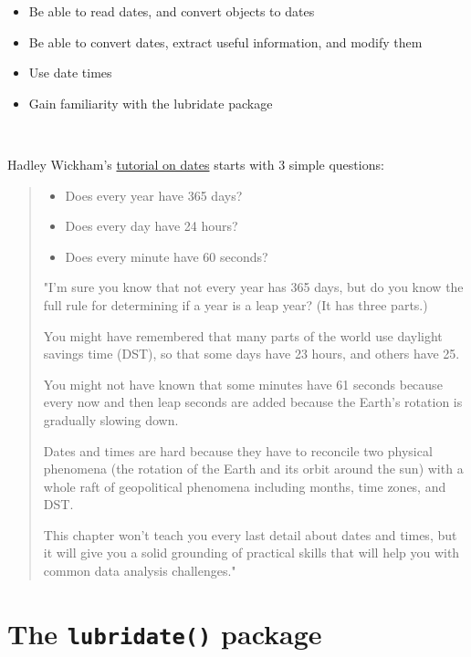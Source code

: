 \documentclass[]{book}
\providecommand{\tightlist}{%
  \setlength{\itemsep}{0pt}\setlength{\parskip}{0pt}}
\begin{document}
\begin{itemize}
\tightlist
\item
  Be able to read dates, and convert objects to dates
\item
  Be able to convert dates, extract useful information, and modify them
\item
  Use date times
\item
  Gain familiarity with the lubridate package
\end{itemize}

~

Hadley Wickham's \href{https://r4ds.had.co.nz/dates-and-times.html}{tutorial on dates} starts with 3 simple questions:

\begin{quote}
\begin{itemize}
\tightlist
\item
  Does every year have 365 days?
\item
  Does every day have 24 hours?
\item
  Does every minute have 60 seconds?
\end{itemize}

"I'm sure you know that not every year has 365 days, but do you know the full rule for determining if a year is a leap year? (It has three parts.)

You might have remembered that many parts of the world use daylight savings time (DST), so that some days have 23 hours, and others have 25.

You might not have known that some minutes have 61 seconds because every now and then leap seconds are added because the Earth's rotation is gradually slowing down.

Dates and times are hard because they have to reconcile two physical phenomena (the rotation of the Earth and its orbit around the sun) with a whole raft of geopolitical phenomena including months, time zones, and DST.

This chapter won't teach you every last detail about dates and times, but it will give you a solid grounding of practical skills that will help you with common data analysis challenges."
\end{quote}

\hypertarget{the-lubridate-package}{%
\section*{\texorpdfstring{The \texttt{lubridate()} package}{The lubridate() package}}\label{the-lubridate-package}}
\end{document}
